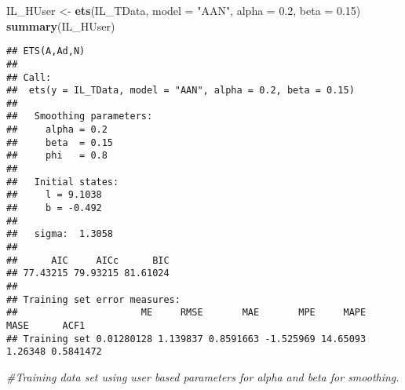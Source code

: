 \documentclass[
]{article}
\newenvironment{Shaded}{\begin{snugshade}}{\end{snugshade}}
\newcommand{\CommentTok}[1]{\textcolor[rgb]{0.56,0.35,0.01}{\textit{#1}}}
\newcommand{\DataTypeTok}[1]{\textcolor[rgb]{0.13,0.29,0.53}{#1}}
\newcommand{\DecValTok}[1]{\textcolor[rgb]{0.00,0.00,0.81}{#1}}
\newcommand{\FloatTok}[1]{\textcolor[rgb]{0.00,0.00,0.81}{#1}}
\newcommand{\KeywordTok}[1]{\textcolor[rgb]{0.13,0.29,0.53}{\textbf{#1}}}
\newcommand{\NormalTok}[1]{#1}
\newcommand{\OperatorTok}[1]{\textcolor[rgb]{0.81,0.36,0.00}{\textbf{#1}}}
\newcommand{\StringTok}[1]{\textcolor[rgb]{0.31,0.60,0.02}{#1}}
\begin{document}
\begin{Shaded}
\end{Shaded}

\begin{Shaded}
\begin{Highlighting}[]
\NormalTok{IL_HUser <-}\StringTok{ }\KeywordTok{ets}\NormalTok{(IL_TData, }\DataTypeTok{model =} \StringTok{"AAN"}\NormalTok{, }\DataTypeTok{alpha =} \FloatTok{0.2}\NormalTok{, }\DataTypeTok{beta =} \FloatTok{0.15}\NormalTok{)}
\KeywordTok{summary}\NormalTok{(IL_HUser)}
\end{Highlighting}
\end{Shaded}

\begin{verbatim}
## ETS(A,Ad,N) 
## 
## Call:
##  ets(y = IL_TData, model = "AAN", alpha = 0.2, beta = 0.15) 
## 
##   Smoothing parameters:
##     alpha = 0.2 
##     beta  = 0.15 
##     phi   = 0.8 
## 
##   Initial states:
##     l = 9.1038 
##     b = -0.492 
## 
##   sigma:  1.3058
## 
##      AIC     AICc      BIC 
## 77.43215 79.93215 81.61024 
## 
## Training set error measures:
##                      ME     RMSE       MAE       MPE     MAPE    MASE      ACF1
## Training set 0.01280128 1.139837 0.8591663 -1.525969 14.65093 1.26348 0.5841472
\end{verbatim}

\begin{Shaded}
\begin{Highlighting}[]
\CommentTok{#Training data set using user based parameters for alpha and beta for smoothing.}
\end{Highlighting}
\end{Shaded}
\end{document}
